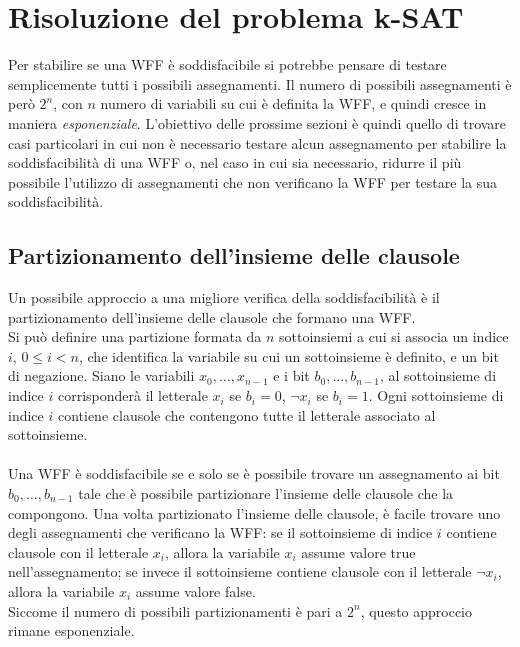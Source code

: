 \chapter{Risoluzione del problema k-SAT}

Per stabilire se una WFF è soddisfacibile si potrebbe
pensare di testare semplicemente tutti i possibili assegnamenti. 
Il numero di possibili assegnamenti è però $2^n$, con $n$ numero di variabili su cui è definita la WFF, 
e quindi cresce in maniera \textit{esponenziale}.
L'obiettivo delle prossime sezioni è quindi quello di trovare
casi particolari in cui non è necessario testare alcun assegnamento per 
stabilire la soddisfacibilità di una WFF o, nel caso in cui sia necessario,
ridurre il più possibile l'utilizzo di assegnamenti che non verificano la WFF
per testare la sua soddisfacibilità.

\section{Partizionamento dell'insieme delle clausole}

Un possibile approccio a una migliore verifica della soddisfacibilità
è il partizionamento dell'insieme delle clausole che formano una WFF.\\
Si può definire una partizione formata da $n$ sottoinsiemi a cui si associa
un indice $i$, $0 \le i < n$, che identifica
la variabile su cui un sottoinsieme è definito, e un bit di negazione.
Siano le variabili $x_0, \ldots, x_{n-1}$ e i bit $b_0, \ldots, b_{n-1}$,
al sottoinsieme di indice $i$ corrisponderà il letterale $x_i$ se $b_i = 0$, $\lnot x_i$ se $b_i = 1$.
Ogni sottoinsieme di indice $i$ contiene clausole che contengono
tutte il letterale associato al sottoinsieme.\\
\\
Una WFF è soddisfacibile se e solo se è possibile trovare un assegnamento ai bit $b_0, \ldots, b_{n-1}$ tale che è possibile partizionare l'insieme delle clausole che la compongono.
Una volta partizionato l'insieme delle clausole, è facile trovare uno 
degli assegnamenti che verificano la WFF: se il sottoinsieme di indice $i$ contiene clausole con il letterale $x_i$, allora
la variabile $x_i$ assume valore true nell'assegnamento; se invece
il sottoinsieme contiene clausole con il letterale 
$\lnot x_i$, allora la variabile $x_i$ assume valore false.\\
Siccome il numero di possibili partizionamenti è pari a $2^n$, questo approccio
rimane esponenziale.

